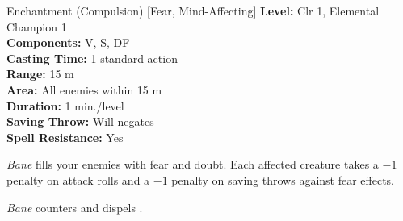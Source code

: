 {Enchantment (Compulsion) [Fear, Mind-Affecting]}
{
	\textbf{Level:}
	Clr 1, Elemental Champion 1\\
	\textbf{Components:}
	V, S, DF\\
	\textbf{Casting Time:}
	1 standard action\\
	\textbf{Range:}
	15 m\\
	\textbf{Area:}
	All enemies within 15 m\\
	\textbf{Duration:}
	1 min./level\\
	\textbf{Saving Throw:}
	Will negates\\
	\textbf{Spell Resistance:}
	Yes\\
}
{
	\emph{Bane} fills your enemies with fear and doubt. Each affected creature takes a $-1$ penalty on attack rolls and a $-1$ penalty on saving throws against fear effects.

	\emph{Bane} counters and dispels .

}
